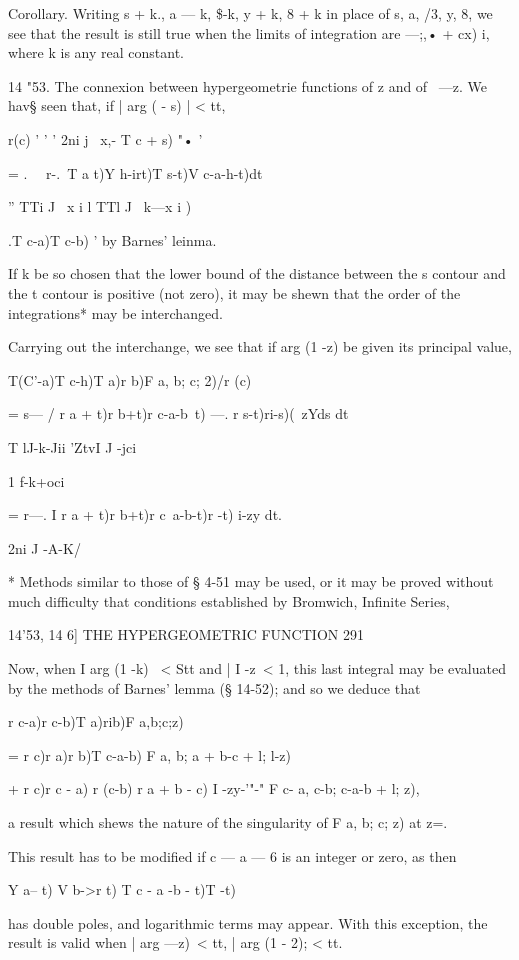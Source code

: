 Corollary. Writing s + k., a — k, \$-k, y + k, 8 + k in place of s, a,
/3, y, 8, we see that the result is still true when the limits of
integration are —;,• + cx) i, where k is any real constant.

14 "53. The connexion between hypergeometrie functions of z and of \
—z. We hav§ seen that, if | arg ( - s) | < tt,

r(c) ' ' ' 2ni j \ x,- T c + s) "• '

= . \ \ r-.\ T a t)Y h-irt)T s-t)V c-a-h-t)dt\

'' TTi J \ x i l TTl J ~k—x i )

.T c-a)T c-b) ' by Barnes' leinma.

If k be so chosen that the lower bound of the distance between the s
contour and the t contour is positive (not zero), it may be shewn that
the order of the integrations* may be interchanged.

Carrying out the interchange, we see that if arg (1 -z) be given its
principal value,

T(C'-a)T c-h)T a)r b)F a, b; c; 2)/r (c)

= s— / r a + t)r b+t)r c-a-b~t) —. r s-t)ri-s)(~zYds dt

 T lJ-k-Jii 'ZtvI J -jci

1 f-k+oci

= r—. I r a + t)r b+t)r c~a-b-t)r -t) i-zy dt.

2ni J -A-K/

* Methods similar to those of § 4-51 may be used, or it may be proved
without much difficulty that conditions established by Bromwich,
Infinite Series, %

14'53, 14 6] THE HYPERGEOMETRIC FUNCTION 291

Now, when I arg (1 -k) \ < Stt and | I -z\ < 1, this last integral may
be evaluated by the methods of Barnes' lemma (§ 14-52); and so we
deduce that

r c-a)r c-b)T a)rib)F a,b;c;z)

= r c)r a)r b)T c-a-b) F a, b; a + b-c + l; l-z)

+ r c)r c - a) r (c-b) r a + b - c) I -zy-'"-" F c- a, c-b; c-a-b + l;
z),

a result which shews the nature of the singularity of F a, b; c; z)
at z=.

This result has to be modified if c — a — 6 is an integer or zero, as
then

Y a-- t) V b->r t) T c - a -b - t)T -t)

has double poles, and logarithmic terms may appear. With this
exception, the result is valid when | arg —z)\ < tt, | arg (1 - 2); <
tt.

